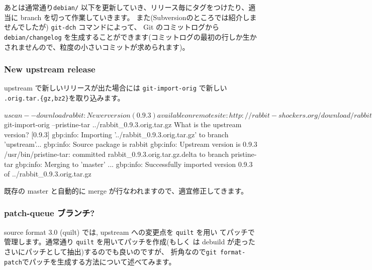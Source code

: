 \documentclass[mingoth,a4paper]{jsarticle}
\begin{document}
あとは通常通り{\tt{debian/}} 以下を更新していき、リリース毎にタグをつけたり、適当に branch を切って作業していきます。
また(Subversionのところでは紹介しませんでしたが) {\tt{git-dch}} コマンドによって、
Git のコミットログから {\tt{debian/changelog}} を生成することができます(コミットログの最初の行しか生かされませんので、粒度の小さいコミットが求められます)。

\subsubsection{New upstream release}

upstream で新しいリリースが出た場合には {\tt{git-import-orig}} で新しい {\tt{.orig.tar.\{gz,bz2\}}}を取り込みます。
\begin{commandline}
 $ uscan --download
  rabbit: Newer version (0.9.3) available on remote site:
    http://rabbit-shockers.org/download/rabbit-0.9.3.tar.gz
    (local version is 0.9.2)
  rabbit: Successfully downloaded updated package rabbit-0.9.3.tar.gz
      and symlinked rabbit_0.9.3.orig.tar.gz to it
 $ git-import-orig --pristine-tar ../rabbit_0.9.3.orig.tar.gz
  What is the upstream version? [0.9.3]
  gbp:info: Importing '../rabbit_0.9.3.orig.tar.gz' to branch 'upstream'...
  gbp:info: Source package is rabbit
  gbp:info: Upstream version is 0.9.3
  /usr/bin/pristine-tar: committed rabbit_0.9.3.orig.tar.gz.delta to branch pristine-tar
  gbp:info: Merging to 'master'
  ...
  gbp:info: Successfully imported version 0.9.3 of ../rabbit_0.9.3.orig.tar.gz
\end{commandline}
既存の master と自動的に merge が行なわれますので、適宜修正してきます。

\subsubsection{patch-queue ブランチ?}

source format 3.0 (quilt) では, upstream への変更点を {\tt{quilt}} を用い
てパッチで管理します。通常通り {\tt{quilt}} を用いてパッチを作成(もしく
は debuild が走ったさいにパッチとして抽出)するのでも良いのですが、
折角なので{\tt{git format-patch}}でパッチを生成する方法について述べてみます。
\end{document}

